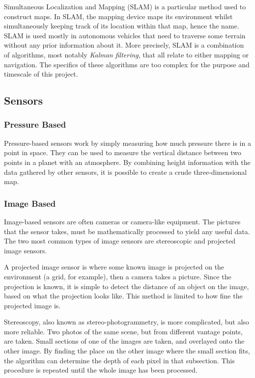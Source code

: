 Simultaneous Localization and Mapping (SLAM) is a particular method used to construct maps. In SLAM, the mapping device maps its environment whilst simultaneously keeping track of its location within that map, hence the name. SLAM is used mostly in autonomous vehicles that need to traverse some terrain without any prior information about it. More precisely, SLAM is a combination of algorithms, most notably \textit{Kalman filtering}, that all relate to either mapping or navigation. The specifics of these algorithms are too complex for the purpose and timescale of this project.

\subsection{Sensors}
\subsubsection{Pressure Based}
Pressure-based sensors work by simply measuring how much pressure there is in a point in space. They can be used to measure the vertical distance between two points in a planet with an atmosphere\cite{barometric1}\cite{barometric2}. By combining height information with the data gathered by other sensors, it is possible to create a crude three-dimensional map.

\subsubsection{Image Based}
Image-based sensors are often cameras or camera-like equipment. The pictures that the sensor takes, must be mathematically processed to yield any useful data. The two most common types of image sensors are stereoscopic and projected image sensors.

A projected image sensor is where some known image is projected on the environment (a grid, for example), then a camera takes a picture. Since the projection is known, it is simple to detect the distance of an object on the image, based on what the projection looks like. This method is limited to how fine the projected image is.

Stereoscopy, also known as stereo-photogrammetry, is more complicated, but also more reliable. Two photos of the same scene, but from different vantage points, are taken. Small sections of one of the images are taken, and overlayed onto the other image. By finding the place on the other image where the small section fits, the algorithm can determine the depth of each pixel in that subsection. This procedure is repeated until the whole image has been processed.

